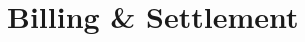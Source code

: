\documentclass[../main/main]{subfiles}
\begin{document}
\newpage
\chapter{Billing \& Settlement}
\end{document}
